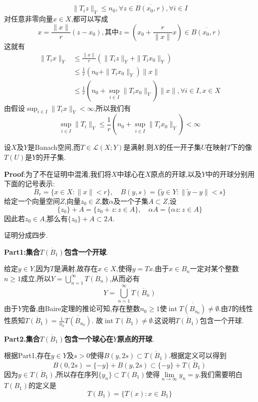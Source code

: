 $$
\|T_iz\|_{Y}\leqslant n_0,\forall z\in \overline{B(x_0,r)},\forall i\in I
$$
对任意非零向量$x\in X$,都可以写成
$$
x=\frac{\|x\|}{r}(z-x_0),\text{其中}z=\left(x_0+\frac{r}{\|x\|}x\right)\in\overline{B(x_0,r)}
$$
这就有
$$
\begin{aligned}
    \|T_ix\|_{Y} &\leqslant \frac{\|x\|}{r}(\|T_iz\|_{Y}+\|T_ix_0\|_{Y})\\
                 &\leqslant \frac{1}{r}(n_0+\|T_ix_0\|_{Y})\|x\|\\
                 &\leqslant \frac{1}{r}(n_0+\sup_{i\in I}\|T_ix_0\|_{Y})\|x\|,\forall i\in I,x\in X
\end{aligned}
$$
由假设$\sup_{i\in I}\|T_ix\|_{Y}<\infty$,所以我们有
$$
\sup_{i\in I}\|T_i\|_{Y}\leqslant \frac{1}{r}(n_0+\sup_{i\in I}\|T_ix_0\|_{Y})<\infty
$$
\begin{tcolorbox}[colback=KuangNei,colframe=BianKuang,title=\textbf{Banach开映射定理},sharpish corners]
    设$X$及$Y$是Banach空间,而$T\in\mathcal{L}(X;Y)$是满射.则$X$的任一开子集$U$在映射$T$下的像$T(U)$是$Y$的开子集.
\end{tcolorbox}
\textbf{Proof}:为了不在证明中混淆,我们将$X$中球心在$X$原点的开球,以及$Y$中的开球分别用下面的记号表示:
$$
B_r=\{x\in X:\|x\|<r\},\quad B(y,s)=\{\tilde{y}\in Y:\|\tilde{y}-y\|<s\}
$$
给定一个向量空间$Z$,向量$z_0\in Z$,数$\alpha$及一个子集$A\subset Z$,设
$$
\{z_0\}+A=\{z_0+z:z\in A\},\quad \alpha A=\{\alpha z:z\in A\}
$$
因此若$z_0\in A$,那么有$\{z_0\}+A\subset 2A$.\par
证明分成四步.\par
\textbf{Part1:集合$\overline{T(B_1)}$包含一个开球}.\par
给定$y\in Y$,因为$T$是满射,故存在$x\in X$,使得$y=Tx$.由于$x\in B_n$一定对某个整数$n\geqslant 1$成立,所以$Y=\bigcup_{n=1}^{\infty}T(B_n)$,从而必有
$$
Y=\bigcup_{n=1}^{\infty}\overline{T(B_n)}
$$
由于$Y$完备,由Baire定理的推论可知,存在整数$n_0\geqslant 1$使$\operatorname{int}\overline{T(B_{n_0})}\neq \emptyset$.由$T$的线性性质知$\overline{T(B_1)}=\frac{1}{n_0}\overline{T(B_{n_0})}$.
故$\operatorname{int}\overline{T(B_1)}\neq\emptyset$.这说明$\overline{T(B_1)}$包含一个开球.\par
\textbf{Part2.集合$\overline{T(B_1)}$包含一个球心在$Y$原点的开球}.\par
根据Part1,存在$y\in Y$及$s>0$使得$B(y,2s)\subset\overline{T(B_1)}$.根据定义可以得到
$$
B(0,2s)=\{-y\}+B(y,2s)\subset \{-y\}+\overline{T(B_1)}
$$
因为$y\in \overline{T(B_1)}$,所以存在序列$\{y_n\}\subset T(B_1)$使得$\lim\limits_{n\to\infty}y_n=y$.我们需要明白$T(B_1)$的定义是
$$
T(B_1)=\{T(x):x\in B_1\}
$$
